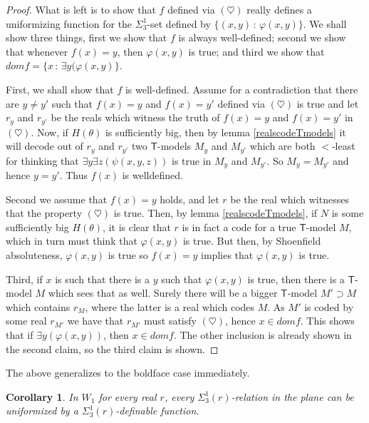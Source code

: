 \documentclass[a4paper,12pt]{article}
\newtheorem{corollary}[theorem]{Corollary}
\newcommand{\T}{\mathsf{T}}
\begin{document}
\begin{proof}
What is left is to show that $f$ defined via $(\heartsuit)$ really defines a uniformizing function for the $\Sigma^1_3$-set defined by $\{ (x,y) \, : \, \varphi(x,y)\}$. We shall show three things, first we show that $f$ is always well-defined; second we show that whenever $f(x)=y$, then $\varphi(x,y)$ is true; and third we show that $dom f= \{x \, : \, \exists y (\varphi(x,y)\}$.

First, we shall show that $f$ is well-defined. Assume for a contradiction that there are $y\ne y'$ such that $f(x)=y$ and $f(x)=y'$ defined via $(\heartsuit)$ is true and let $r_y$ and $r_{y'}$ be the reals which witness the truth of $f(x)=y$ and $f(x)=y'$ in $(\heartsuit)$.
Now, if $H(\theta)$ is sufficiently big, then by lemma \ref{realscodeTmodels} it will decode out of $r_{y}$ and $r_{y'}$ two $\T$-models $M_y$ and $M_{y'}$ which are both $<$-least for thinking that $\exists y \exists z (\psi(x,y,z))$ is true in $M_y$ and $M_{y'}$. So $M_y=M_{y'}$ and hence $y=y'$. Thus $f(x)$ is welldefined.

Second we assume that $f(x)=y$ holds, and let $r$ be the real which witnesses that the property $(\heartsuit)$ is true. Then, by lemma \ref{realscodeTmodels}, if $N$ is some sufficiently big $H(\theta)$, it is clear that $r$ is in fact a code for a true $\T$-model $M$, which in turn must think that $\varphi(x,y)$ is true. But then, by Shoenfield absoluteness, $\varphi(x,y)$ is true so $f(x)=y$ implies that $\varphi(x,y)$ is true.

Third, if $x$ is such that there is a $y$ such that $\varphi(x,y)$ is true, then there is a $\T$-model $M$ which sees that as well.
Surely there will be a bigger $\T$-model $M' \supset M$ which contains $r_M$, where the latter is a real which codes $M$.
As $M'$ is coded by some real $r_{M'}$ we have that $r_{M'}$ must satisfy $(\heartsuit)$, hence $x \in dom f$. This shows that if
$\exists y (\varphi(x,y))$, then $x \in dom f$. The other inclusion is already shown in the second claim, so the third claim is shown.


\end{proof}



The above generalizes to the boldface case immediately.
\begin{corollary}
In $W_1$ for every real $r$, every $\Sigma^1_3(r)$-relation in the plane can be uniformized by a $\Sigma^1_3(r)$-definable function.
\end{corollary}
\end{document}
